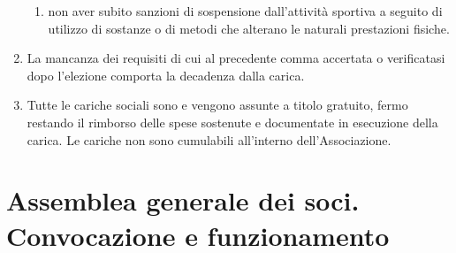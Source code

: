 \documentclass{djtsasddoc}
\begin{document}
\begin{enumerate}
\begin{enumerate}
			\item non aver subito sanzioni di sospensione dall'attività sportiva a seguito di utilizzo di sostanze o di metodi che alterano le naturali prestazioni fisiche.
		\end{enumerate}
		\item La mancanza dei requisiti di cui al precedente comma accertata o verificatasi dopo l'elezione comporta la decadenza dalla carica.
		\item Tutte le cariche sociali sono e vengono assunte a titolo gratuito, fermo restando il rimborso delle  spese sostenute e documentate in esecuzione della carica. Le cariche non sono cumulabili all'interno dell'Associazione.
	\end{enumerate}
	
	\section{Assemblea generale dei soci. Convocazione e funzionamento}
\end{document}
